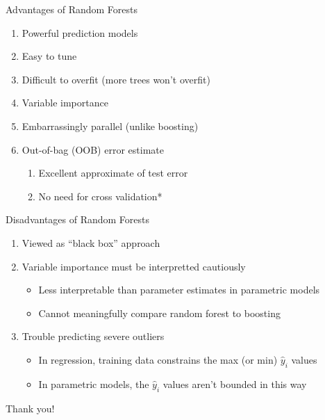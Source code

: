 \documentclass[pdf]{beamer}
\begin{document}
		\begin{frame}{Advantages of Random Forests}
			\begin{enumerate}
				\item Powerful prediction models
				\item Easy to tune
				\item Difficult to overfit (more trees won't overfit)
				\item Variable importance
				\item Embarrassingly parallel (unlike boosting)
				\item Out-of-bag (OOB) error estimate
					\begin{enumerate}[1]
						\item Excellent approximate of test error
						\item No need for cross validation*
					\end{enumerate}

			\end{enumerate}
		\end{frame}

		\begin{frame}{Disadvantages of Random Forests}
			\begin{enumerate}
				\item Viewed as ``black box'' approach
				\item Variable importance must be interpretted cautiously
					\begin{itemize}
						\item Less interpretable than parameter estimates in parametric models
						\item Cannot meaningfully compare random forest to boosting 
					\end{itemize}  
				\item Trouble predicting severe outliers
					\begin{itemize}
						\item In regression, training data constrains the max (or min) $\hat{y}_i$ values 
						\item In parametric models, the $\hat{y}_i$ values aren't bounded in this way
					\end{itemize}
				
			\end{enumerate}
		\end{frame}
	

		
	\begin{frame}{\hspace{3 mm}}
		\begin{center}
			Thank you!
		\end{center}
	\end{frame} 
		
		
		
\end{document}
